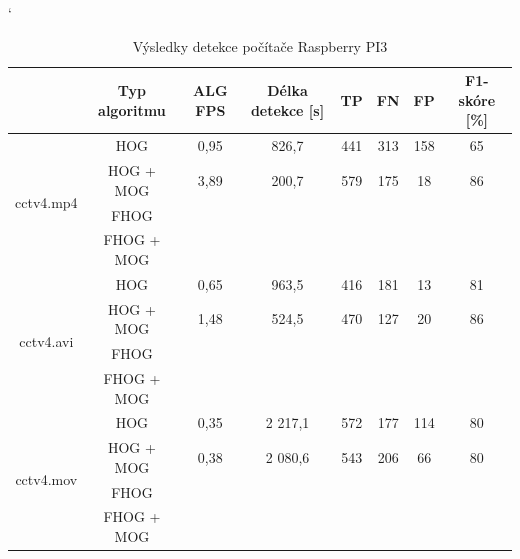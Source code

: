 \begin{table}[H]
\catcode`
\centering
\caption{Výsledky detekce počítače Raspberry PI3}
\label{resultTabRPI3}
\begin{tabular}{|c|c|c|c|c|c|c|c|}
\hline
                         & Typ algoritmu 	& ALG FPS & Délka detekce [s] & TP 		& FN 	& FP 	& F1-skóre [\%] \\ \hline
\multirow{4}{*}{cctv4.mp4} & HOG         	&   0,95  &   826,7       	  & 441   	& 313   & 158   &   65      	\\ \cline{2-8} 
                         & HOG + MOG  		&   3,89  &   200,7       	  & 579		& 175  	& 18   	& 	86	        \\ \cline{2-8} 
                         & FHOG       		&         &   			  &    		&    	&    	& 		        \\ \cline{2-8} 
                         & FHOG + MOG 		&         &               	  &    		&    	&    	& 		        \\ \hline\hline 
\multirow{4}{*}{cctv4.avi} & HOG      		&   0,65  &   963,5        	  & 416   	& 181 	& 13    & 	81	        \\ \cline{2-8} 
                         & HOG + MOG  		&   1,48  &   524,5       	  & 470		& 127 	& 20   	& 	86	        \\ \cline{2-8} 
                         & FHOG       		&         &               	  &    		&    	&    	& 		        \\ \cline{2-8} 
                         & FHOG + MOG 		&         &               	  &    		&    	&    	& 		        \\ \hline \hline
\multirow{4}{*}{cctv4.mov} & HOG      		&   0,35  &   2 217,1      	  & 572 	& 177 	& 114  	& 	80	        \\ \cline{2-8} 
                         & HOG + MOG  		&   0,38  &   2 080,6      	  & 543		& 206  	& 66	& 	80	        \\ \cline{2-8} 
                         & FHOG       		&         &               	  &    		&    	&    	& 		        \\ \cline{2-8} 
                         & FHOG + MOG 		&         &               	  &    		&    	&    	& 		        \\ \hline
\end{tabular}
\end{table}


